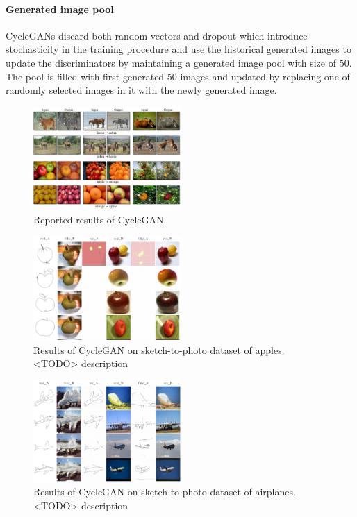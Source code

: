 \paragraph{Generated image pool}
CycleGANs discard both random vectors and dropout which introduce stochasticity in the training procedure and use the historical generated images to update the discriminators by maintaining a generated image pool with size of 50. The pool is filled with first generated 50 images and updated by replacing one of randomly selected images in it with the newly generated image.
%
\begin{figure}
	\label{cyclegan_reported_results}
	\includegraphics[width=0.5\textwidth]{figures/cyclegan/reported_results.jpg}
	\caption{Reported results of CycleGAN.}
\end{figure}
%
\begin{figure}
	\label{cyclegan_sketch2photo_apple_200epochs_torch}
	\includegraphics[width=0.5\textwidth]{figures/cyclegan/sketch2photo_apple_200epochs_torch.png}
	\caption{Results of CycleGAN on sketch-to-photo dataset of apples. <TODO> description}
\end{figure}
%
\begin{figure}
	\label{cyclegan_sketch2photo_airplane_200epochs_torch}
	\includegraphics[width=0.5\textwidth]{figures/cyclegan/sketch2photo_airplane_200epochs_torch.png}
	\caption{Results of CycleGAN on sketch-to-photo dataset of airplanes. <TODO> description}
\end{figure}
%
%
